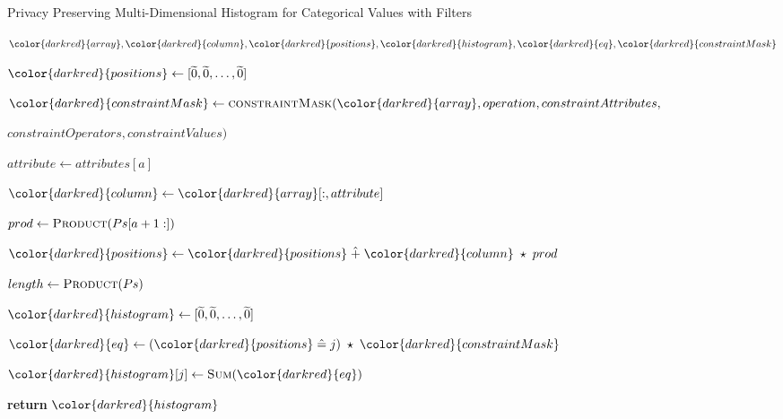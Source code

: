 \begin{algorithm}[H]
\caption{Privacy Preserving Multi-Dimensional Histogram for Categorical Values with Filters}\label{a:filters-2d-histogram}
\begin{algorithmic}[1]
  \renewcommand{\algorithmicrequire}{\textbf{Private Vars:}}
  \Require ${\color{darkred}{array}}, {\color{darkred}{column}}, {\color{darkred}{positions}}, {\color{darkred}{histogram}}, {\color{darkred}{eq}}, {\color{darkred}{constraintMask}}$


      \State
      ${\color{darkred}{positions}} \gets [\enc{0}, \enc{0}, \dots, \enc{0}] $

      \State ${\color{darkred}{constraintMask}} \gets \textsc{constraintMask}({\color{darkred}{array}}, operation, constraintAttributes, $\par\hfill$ constraintOperators, constraintValues)$


        \State $attribute \gets attributes[a]$

        \State ${\color{darkred}{column}} \gets {\color{darkred}{array}}[:, attribute]$ 

        \State $prod \gets \textsc{Product}(Ps[a+1:])$ 

        \State ${\color{darkred}{positions}} \gets {\color{darkred}{positions}} \hplus {\color{darkred}{column}} \hmul prod$

      \EndFor

      \State $length \gets \textsc{Product}(Ps)$

      \State ${\color{darkred}{histogram}} \gets [\enc{0}, \enc{0}, \dots, \enc{0}]$



        \State ${\color{darkred}{eq}} \gets ({\color{darkred}{positions}} \heq j) \hmul {\color{darkred}{constraintMask}}$

        \State ${\color{darkred}{histogram}}[j] \gets \textsc{Sum}({\color{darkred}{eq}})$

      \EndFor

      \State \textbf{return} {${\color{darkred}{histogram}}$}
  \EndProcedure

\end{algorithmic}
\end{algorithm}

